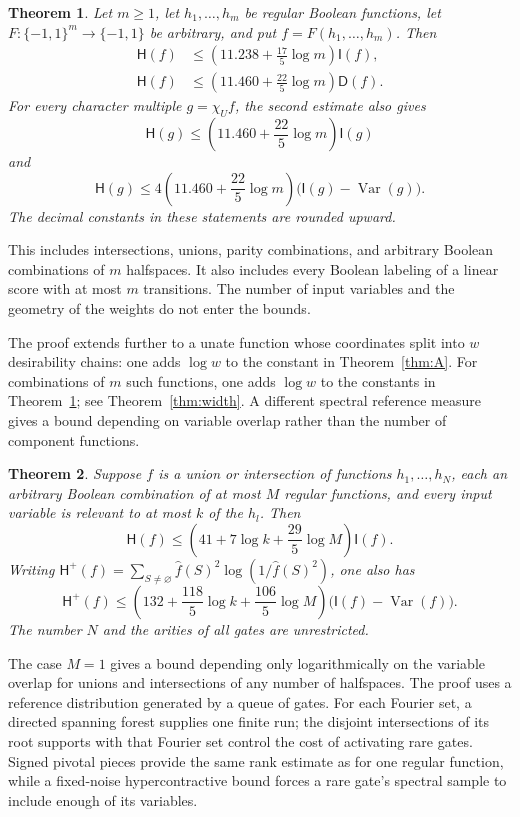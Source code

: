 \documentclass[11pt]{amsart}
\newtheorem{mainthm}{Theorem}
\theoremstyle{definition}
\theoremstyle{remark}
\newcommand{\bits}{\{-1,1\}}
\newcommand{\HH}{\mathsf H}
\newcommand{\I}{\mathsf I}
\newcommand{\D}{\mathsf D}
\DeclareMathOperator{\Var}{Var}
\newcommand{\wh}[1]{\widehat{#1}}
\begin{document}
\begin{mainthm}\label{thm:B}
Let $m\ge1$, let $h_1,\ldots,h_m$ be regular Boolean functions, let $F:\bits^m\to\bits$ be arbitrary, and put $f=F(h_1,\ldots,h_m)$. Then
\begin{align}
 \HH(f)&\le \left(11.238+\frac{17}{5}\log m\right)\I(f),\label{eq:multiI}\\
 \HH(f)&\le \left(11.460+\frac{22}{5}\log m\right)\D(f).\label{eq:multiD}
\end{align}
For every character multiple $g=\chi_U f$, the second estimate also gives
\[
 \HH(g)\le \left(11.460+\frac{22}{5}\log m\right)\I(g)
\]
and
\[
 \HH(g)\le4\left(11.460+\frac{22}{5}\log m\right)
                  \bigl(\I(g)-\Var(g)\bigr).
\]
The decimal constants in these statements are rounded upward.
\end{mainthm}

This includes intersections, unions, parity combinations, and arbitrary Boolean combinations of $m$ halfspaces.
It also includes every Boolean labeling of a linear score with at most $m$ transitions.
The number of input variables and the geometry of the weights do not enter the bounds.

The proof extends further to a unate function whose coordinates split into $w$ desirability chains: one adds $\log w$ to the constant in Theorem~\ref{thm:A}. For combinations of $m$ such functions, one adds $\log w$ to the constants in Theorem~\ref{thm:B}; see Theorem~\ref{thm:width}.
A different spectral reference measure gives a bound depending on variable overlap rather than the number of component functions.

\begin{mainthm}\label{thm:readk-intro}
Suppose $f$ is a union or intersection of functions $h_1,\ldots,h_N$, each an arbitrary Boolean combination of at most $M$ regular functions, and every input variable is relevant to at most $k$ of the $h_l$. Then
\[
 \HH(f)\le\left(41+7\log k+\frac{29}{5}\log M\right)\I(f).
\]
Writing $\HH^+(f)=\sum_{S\ne\varnothing}\wh f(S)^2\log(1/\wh f(S)^2)$, one also has
\[
 \HH^+(f)\le
 \left(132+\frac{118}{5}\log k+\frac{106}{5}\log M\right)
 \bigl(\I(f)-\Var(f)\bigr).
\]
The number $N$ and the arities of all gates are unrestricted.
\end{mainthm}

The case $M=1$ gives a bound depending only logarithmically on the variable overlap for unions and intersections of any number of halfspaces.
The proof uses a reference distribution generated by a queue of gates.
For each Fourier set, a directed spanning forest supplies one finite run; the disjoint intersections of its root supports with that Fourier set control the cost of activating rare gates.
Signed pivotal pieces provide the same rank estimate as for one regular function, while a fixed-noise hypercontractive bound forces a rare gate's spectral sample to include enough of its variables.
\end{document}
